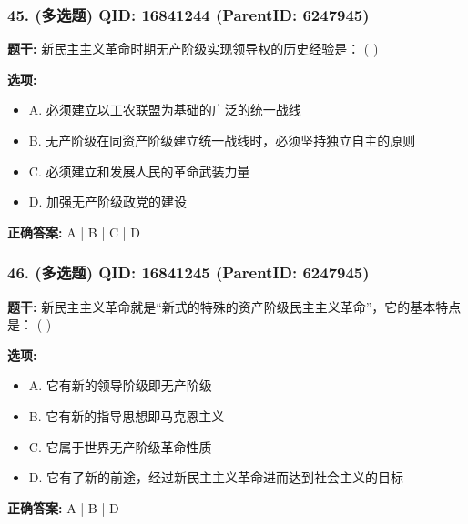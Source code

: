 \documentclass[12pt,UTF8]{ctexart}
\begin{document}
\subsubsection*{45. (多选题) \small QID: 16841244 (ParentID: 6247945)}

\textbf{题干:}
新民主主义革命时期无产阶级实现领导权的历史经验是： ( )



\textbf{选项:}
\begin{itemize}[leftmargin=*]

  \item A. 必须建立以工农联盟为基础的广泛的统一战线

  \item B. 无产阶级在同资产阶级建立统一战线时，必须坚持独立自主的原则

  \item C. 必须建立和发展人民的革命武装力量

  \item D. 加强无产阶级政党的建设

\end{itemize}

\textbf{正确答案:}
A | B | C | D

\vspace{0.3em}\hrulefill\vspace{0.7em}

\subsubsection*{46. (多选题) \small QID: 16841245 (ParentID: 6247945)}

\textbf{题干:}
新民主主义革命就是“新式的特殊的资产阶级民主主义革命”，它的基本特点是： ( )



\textbf{选项:}
\begin{itemize}[leftmargin=*]

  \item A. 它有新的领导阶级即无产阶级

  \item B. 它有新的指导思想即马克恩主义

  \item C. 它属于世界无产阶级革命性质

  \item D. 它有了新的前途，经过新民主主义革命进而达到社会主义的目标

\end{itemize}

\textbf{正确答案:}
A | B | D
\end{document}
